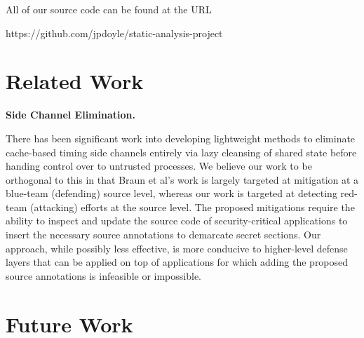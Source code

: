 \documentclass[12pt]{article}
\begin{document}
\begin{multicols*}{2}
  All of our source code can be found at the URL

  https://github.com/jpdoyle/static-analysis-project


  \section{Related Work}


  \textbf{Side Channel Elimination.}

  There has been significant work into
  developing lightweight methods to eliminate cache-based timing side channels
  entirely via lazy cleansing of shared state before handing control over to
  untrusted processes\cite{lcache}. We believe our work to be orthogonal to
  this in that Braun et al's work is largely targeted at mitigation at a
  blue-team (defending) source level, whereas our work is targeted at detecting
  red-team (attacking) efforts at the source level. The proposed  mitigations
  require the ability to inspect and update the source code of
  security-critical applications to insert the necessary source annotations to
  demarcate secret sections. Our approach, while possibly less effective, is
  more conducive to higher-level defense layers that can be applied on top of
  applications for which adding the proposed source annotations is infeasible
  or impossible.

  \section{Future Work}


\end{multicols*}



\end{document}
